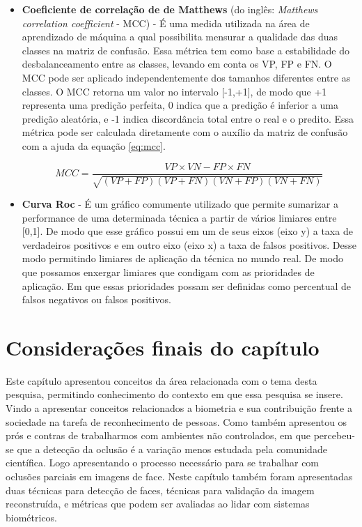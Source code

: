 \begin{itemize}
\item \textbf{Coeficiente de correlação de de Matthews} (do inglês: \textit{Matthews correlation coefficient} - MCC) - É uma medida utilizada na área de aprendizado de máquina a qual possibilita mensurar a qualidade das duas classes na matriz de confusão. Essa métrica tem como base a estabilidade do desbalanceamento entre as classes, levando em conta os VP, FP e FN. O MCC pode ser aplicado independentemente dos tamanhos diferentes entre as classes. O MCC retorna um valor no intervalo [-1,+1], de modo que +1 representa uma predição perfeita, 0 indica que a predição é inferior a uma predição aleatória, e -1 indica discordância total entre o real e o predito. Essa métrica pode ser calculada diretamente com o auxílio da matriz de confusão com a ajuda da equação \ref{eq:mcc}.

\begin{equation}
MCC = \frac{VP \times VN - FP \times FN}{\sqrt{(VP + FP)(VP + FN)(VN + FP)(VN + FN)}}
\label{eq:mcc}
\end{equation}


\item \textbf{Curva Roc} - É um gráfico comumente utilizado que permite sumarizar a performance de uma determinada técnica a partir de vários limiares entre [0,1]. De modo que esse gráfico possui em um de seus eixos (eixo y) a taxa de verdadeiros positivos e em outro eixo (eixo x) a taxa de falsos positivos. Desse modo permitindo limiares de aplicação da técnica no mundo real. De modo que possamos enxergar limiares que condigam com as prioridades de aplicação. Em que essas prioridades possam ser definidas como percentual de falsos negativos ou falsos positivos.
\end{itemize}


\section{Considerações finais do capítulo}

Este capítulo apresentou conceitos da área relacionada com o tema desta pesquisa, permitindo conhecimento do contexto em que essa pesquisa se insere. Vindo a apresentar conceitos relacionados a biometria e sua contribuição frente a sociedade na tarefa de reconhecimento de pessoas. Como também apresentou os prós e contras de trabalharmos com ambientes não controlados, em que percebeu-se que a detecção da oclusão é a variação menos estudada pela comunidade científica. Logo apresentando o processo necessário para se trabalhar com oclusões parciais em imagens de face. Neste capítulo também foram apresentadas duas técnicas para detecção de faces, técnicas para validação da imagem reconstruída, e métricas que podem ser avaliadas ao lidar com sistemas biométricos.